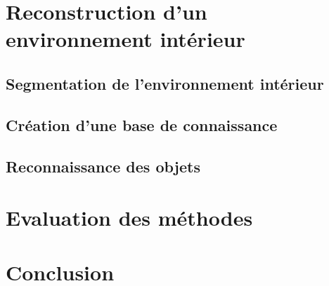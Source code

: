 \documentclass[a4paper,11pt]{article}
\begin{document}
\section{Reconstruction d'un environnement intérieur}
\subsection{Segmentation de l'environnement intérieur}
\subsection{Création d'une base de connaissance}
\subsection{Reconnaissance des objets} 

\section{Evaluation des méthodes}

\section{Conclusion}
\end{document}
